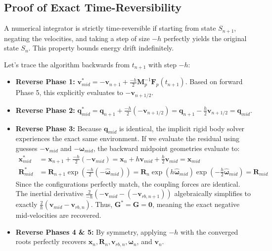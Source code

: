 \subsection{Proof of Exact Time-Reversibility}
A numerical integrator is strictly time-reversible if starting from state $S_{n+1}$, negating the velocities, and taking a step of size $-h$ perfectly yields the original state $S_n$. This property bounds energy drift indefinitely.

Let's trace the algorithm backwards from $t_{n+1}$ with step $-h$:
\begin{itemize}
    \item \textbf{Reverse Phase 1:} $\mathbf{v}_{mid}^* = -\mathbf{v}_{n+1} + \frac{-h}{2}\mathbf{M}_p^{-1} \mathbf{F}_p(t_{n+1})$. Based on forward Phase 5, this explicitly evaluates to $-\mathbf{v}_{n+1/2}$.
    \item \textbf{Reverse Phase 2:} $\mathbf{q}_{mid}^* = \mathbf{q}_{n+1} + \frac{-h}{2} (-\mathbf{v}_{n+1/2}) = \mathbf{q}_{n+1} - \frac{h}{2} \mathbf{v}_{n+1/2} = \mathbf{q}_{mid}$.
    \item \textbf{Reverse Phase 3:} Because $\mathbf{q}_{mid}$ is identical, the implicit rigid body solver experiences the exact same environment. If we evaluate the residual using guesses $-\mathbf{v}_{mid}$ and $-\boldsymbol{\omega}_{mid}$, the backward midpoint geometries evaluate to:
\begin{align}
    \mathbf{x}_{mid}^* &= \mathbf{x}_{n+1} + \frac{-h}{2}(-\mathbf{v}_{mid}) = \mathbf{x}_n + h\mathbf{v}_{mid} + \frac{h}{2}\mathbf{v}_{mid} = \mathbf{x}_{mid} \\
    \mathbf{R}_{mid}^* &= \mathbf{R}_{n+1} \exp\left( \frac{-h}{2} (-\widehat{\boldsymbol{\omega}}_{mid}) \right) = \mathbf{R}_n \exp(h\widehat{\boldsymbol{\omega}}_{mid}) \exp\left(-\frac{h}{2}\widehat{\boldsymbol{\omega}}_{mid}\right) = \mathbf{R}_{mid}
\end{align}
    Since the configurations perfectly match, the coupling forces are identical. The inertial derivative $\frac{2}{-h}(-\mathbf{v}_{mid} - (-\mathbf{v}_{rb, n+1}))$ algebraically simplifies to exactly $\frac{2}{h}(\mathbf{v}_{mid} - \mathbf{v}_{rb, n})$. Thus, $\mathbf{G}^* = \mathbf{G} = \mathbf{0}$, meaning the exact negative mid-velocities are recovered.
    \item \textbf{Reverse Phases 4 \& 5:} By symmetry, applying $-h$ with the converged roots perfectly recovers $\mathbf{x}_n, \mathbf{R}_n, \mathbf{v}_{rb, n}, \boldsymbol{\omega}_n$, and $\mathbf{v}_n$.
\end{itemize}

